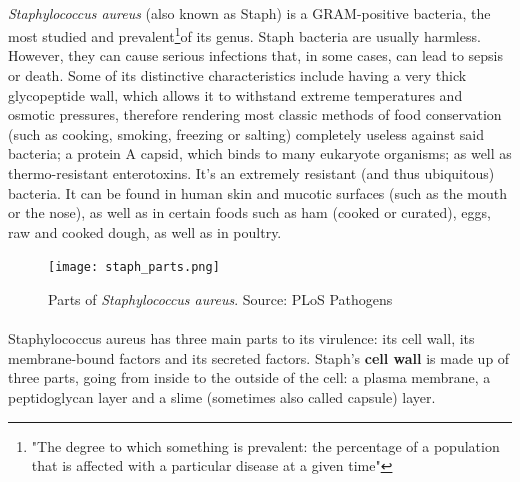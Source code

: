 \paragraph{}\emph{Staphylococcus aureus} (also known as Staph) is a GRAM-positive bacteria, the most studied and prevalent\footnote{"The degree to which something is prevalent: the percentage of a population that is affected with a particular disease at a given time"\cite{DefinitionPREVALENCE1970}}of its genus. Staph bacteria are usually harmless. However, they can cause serious infections that, in some cases, can lead to sepsis or death. Some of its distinctive characteristics include having a very thick glycopeptide wall, which allows it to withstand extreme temperatures and osmotic pressures, therefore rendering most classic methods of food conservation (such as cooking, smoking, freezing or salting) completely useless against said bacteria; a protein A capsid, which binds to many eukaryote organisms; as well as thermo-resistant enterotoxins. It's an extremely resistant (and thus ubiquitous) bacteria. It can be found in human skin and mucotic surfaces (such as the mouth or the nose), as well as in certain foods such as ham (cooked or curated), eggs, raw and cooked dough, as well as in poultry.\newpage
\begin{figure}\begin{center}\texttt{[image: staph\_parts.png]}\end{center}\caption{Parts of \emph{Staphylococcus aureus}. Source: PLoS Pathogens}\end{figure}\paragraph{}Staphylococcus aureus has three main parts to its virulence: its cell wall, its membrane-bound factors and its secreted factors. Staph's \textbf{cell wall} is made up of three parts, going from inside to the outside of the cell: a plasma membrane, a peptidoglycan layer and a slime (sometimes also called capsule) layer. %

